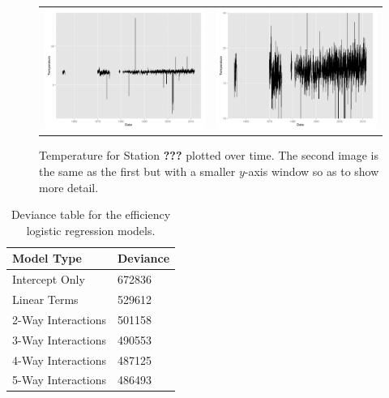 \documentclass[12pt]{article}
\begin{document}
\clearpage




\begin{figure}[h!]
	\centering
	\begin{tabular}{cc}
		\includegraphics[width=.5\textwidth]{Temperature_data_from_mandy_outliers} &
		\includegraphics[width=.5\textwidth]{Temperature_data_from_mandy_changepoints}
	\end{tabular}
	\caption{Temperature for Station \textbf{???} plotted over time.  The second image is the same as the first but with a smaller $y$-axis window so as to show more detail.}
	\label{fig:BasicTS}
\end{figure}

\begin{table}[ht]
	\centering
	\begin{tabular}{|ll|}
  		\hline
		Model Type & Deviance\\
		\hline
		Intercept Only & 672836 \\ 
  		Linear Terms & 529612 \\ 
  		2-Way Interactions & 501158 \\ 
  		3-Way Interactions & 490553 \\ 
  		4-Way Interactions & 487125 \\ 
  		5-Way Interactions & 486493 \\ 
   		\hline
	\end{tabular}
	\caption{Deviance table for the efficiency logistic regression models.}
	\label{tab:homOrdDev}
\end{table}
\end{document}
